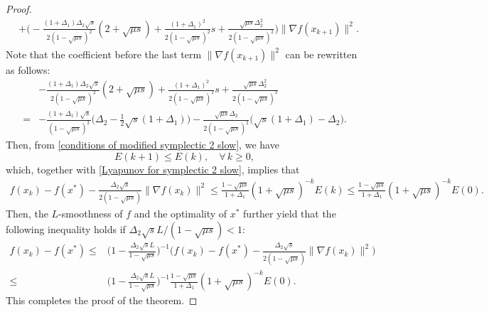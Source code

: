 \documentclass[11pt]{article}
\newcommand{\1}{\mathbf 1}
\numberwithin{equation}{section}
\begin{document}
\begin{proof}
{\begin{align*}
			&+\big(-\frac{(1+\Delta_1)\Delta_2\sqrt{s}}{2(1-\sqrt{\mu s})^2}(2+\sqrt{\mu s})+\frac{(1+\Delta_1)^2}{2(1-\sqrt{\mu s})^2}s+\frac{\sqrt{\mu s}\Delta_2^2}{2(1-\sqrt{\mu s})^2}\big)\|\nabla f(x_{k+1})\|^2.
        \end{align*}
    }
Note that the coefficient before the last term $\|\nabla f(x_{k+1})\|^2$ can be rewritten as follows:
	\begin{align*}
		&-\frac{(1+\Delta_1)\Delta_2\sqrt{s}}{2(1-\sqrt{\mu s})^2}(2+\sqrt{\mu s})+\frac{(1+\Delta_1)^2}{2(1-\sqrt{\mu s})^2}s+\frac{\sqrt{\mu s}\Delta_2^2}{2(1-\sqrt{\mu s})^2}\\
		=&-\frac{(1+\Delta_1)\sqrt{s}}{(1-\sqrt{\mu s})^2}\big(\Delta_2-\frac{1}{2}\sqrt{s}(1+\Delta_1)\big)-\frac{\sqrt{\mu s}\Delta_2}{2(1-\sqrt{\mu s})^2}\big(\sqrt{s}(1+\Delta_1)-\Delta_2\big).
	\end{align*}
Then, from \ref{conditions of modified symplectic 2 slow}, we have 
	\begin{equation*}
		E(k+1)\leqslant E(k), \quad \forall\, k\ge 0,
	\end{equation*}   
    which, together with \eqref{Lyapunov for symplectic 2 slow}, implies that
	\begin{align*}
		f(x_k)-f(x^*)-\frac{\Delta_2\sqrt{s}}{2(1-\sqrt{\mu s})}\|\nabla f(x_k)\|^2 \leqslant \frac{1-\sqrt{\mu s}}{1+\Delta_1}(1+\sqrt{\mu s})^{-k}E(k)\leqslant \frac{1-\sqrt{\mu s}}{1+\Delta_1}(1+\sqrt{\mu s})^{-k}E(0).
	\end{align*}{
    Then, the $L$-smoothness of $f$ and the optimality of $x^*$ further yield that
     the following inequality holds if $\Delta_2\sqrt{s}L/(1-\sqrt{\mu s})<1$:
    \begin{align*}
        f(x_k)-f(x^*) \leqslant &\Big(1-\frac{\Delta_2\sqrt{s}L}{1-\sqrt{\mu s}}\Big)^{-1} \big( f(x_k)-f(x^*)-\frac{\Delta_2\sqrt{s}}{2(1-\sqrt{\mu s})}\|\nabla f(x_k)\|^2\big)\\
        \leqslant & \Big(1-\frac{\Delta_2\sqrt{s}L}{1-\sqrt{\mu s}}\Big)^{-1}\frac{1-\sqrt{\mu s}}{1+\Delta_1}(1+\sqrt{\mu s})^{-k}E(0).
    \end{align*}
    }
	This completes the proof of the theorem.
\end{proof}
\end{document}
